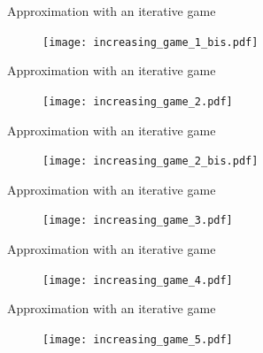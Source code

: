 \documentclass[10pt,aspectratio=169]{beamer}
\begin{document}
\begin{frame}{Approximation with an iterative game}
    \begin{figure}
        \texttt{[image: increasing\_game\_1\_bis.pdf]}
    \end{figure}
\end{frame}

\begin{frame}{Approximation with an iterative game}
    \begin{figure}
        \texttt{[image: increasing\_game\_2.pdf]}
    \end{figure}
\end{frame}

\begin{frame}{Approximation with an iterative game}
    \begin{figure}
        \texttt{[image: increasing\_game\_2\_bis.pdf]}
    \end{figure}
\end{frame}

\begin{frame}{Approximation with an iterative game}
    \begin{figure}
        \texttt{[image: increasing\_game\_3.pdf]}
    \end{figure}
\end{frame}

\begin{frame}{Approximation with an iterative game}
    \begin{figure}
        \texttt{[image: increasing\_game\_4.pdf]}
    \end{figure}
\end{frame}

\begin{frame}{Approximation with an iterative game}
    \begin{figure}
        \texttt{[image: increasing\_game\_5.pdf]}
    \end{figure}
\end{frame}



    
\end{document}
